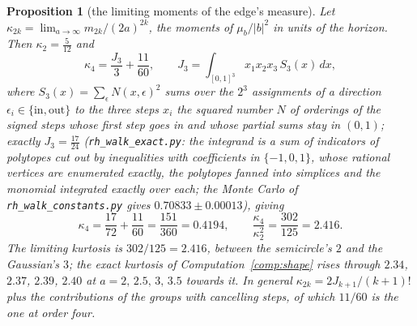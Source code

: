 \documentclass[11pt]{article}
\newtheorem{proposition}[theorem]{Proposition}
\theoremstyle{definition}
\theoremstyle{remark}
\begin{document}
\begin{proposition}[the limiting moments of the edge's measure]\label{prop:limitmoments}
Let $\kappa_{2k}=\lim_{a\to\infty}m_{2k}/(2a)^{2k}$, the moments of $\mu_b/|b|^2$ in units of the horizon. Then $\kappa_2=\tfrac5{12}$ and
\[
\kappa_4=\frac{J_3}3+\frac{11}{60},\qquad J_3=\int_{[0,1]^3}x_1x_2x_3\,S_3(x)\,dx,
\]
where $S_3(x)=\sum_{\epsilon}N(x,\epsilon)^2$ sums over the $2^3$ assignments of a direction $\epsilon_i\in\{\mathrm{in},\mathrm{out}\}$ to the three steps $x_i$ the squared number $N$ of orderings of the signed steps whose first step goes in and whose partial sums stay in $(0,1)$; exactly $J_3=\tfrac{17}{24}$ (\texttt{rh\_walk\_exact.py}: the integrand is a sum of indicators of polytopes cut out by inequalities with coefficients in $\{-1,0,1\}$, whose rational vertices are enumerated exactly, the polytopes fanned into simplices and the monomial integrated exactly over each; the Monte Carlo of \texttt{rh\_walk\_constants.py} gives $0.70833\pm0.00013$), giving
\[
\kappa_4=\frac{17}{72}+\frac{11}{60}=\frac{151}{360}=0.4194,\qquad\frac{\kappa_4}{\kappa_2^2}=\frac{302}{125}=2.416 .
\]
The limiting kurtosis is $302/125=2.416$, between the semicircle's $2$ and the Gaussian's $3$; the exact kurtosis of Computation~\ref{comp:shape} rises through $2.34$, $2.37$, $2.39$, $2.40$ at $a=2,\,2.5,\,3,\,3.5$ towards it. In general $\kappa_{2k}=2J_{k+1}/(k+1)!$ plus the contributions of the groups with cancelling steps, of which $11/60$ is the one at order four.
\end{proposition}
\end{document}
